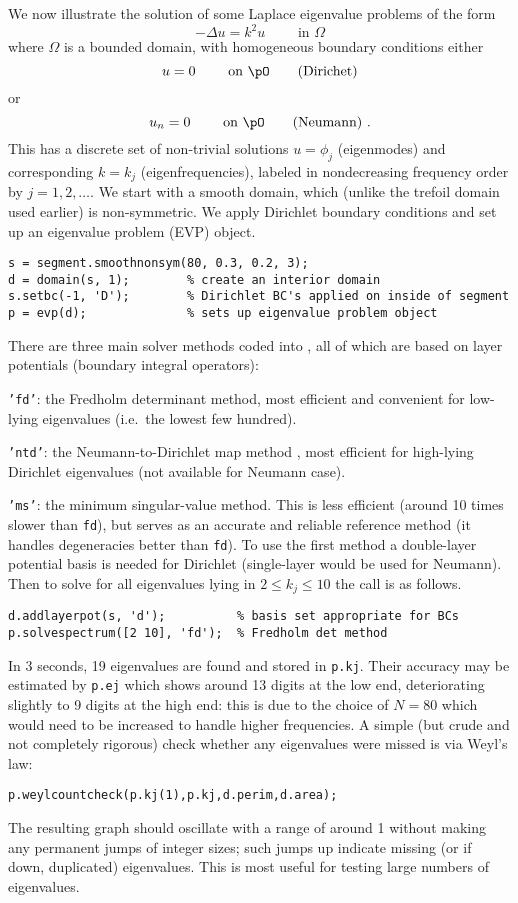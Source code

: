 We now illustrate the solution of some Laplace eigenvalue problems
of the form
$$
-\Delta u = k^2 u    \qquad \mbox{ in } \Omega
$$
where $\Omega$ is a bounded domain,
with homogeneous boundary conditions either
$$
u = 0 \qquad \mbox{ on } \pO   \qquad \mbox{(Dirichet)}
$$
or
$$
u_n = 0 \qquad \mbox{ on } \pO   \qquad \mbox{(Neumann)} ~.
$$
This has a discrete set of non-trivial solutions $u=\phi_j$ (eigenmodes) and corresponding $k=k_j$ (eigenfrequencies), labeled in nondecreasing
frequency order by $j=1,2,\ldots$.
We start with a smooth domain, which (unlike the trefoil domain
used earlier) is non-symmetric. We apply Dirichlet boundary conditions
and set up an eigenvalue problem (EVP) object.
\begin{verbatim}
s = segment.smoothnonsym(80, 0.3, 0.2, 3);
d = domain(s, 1);        % create an interior domain
s.setbc(-1, 'D');        % Dirichlet BC's applied on inside of segment
p = evp(d);              % sets up eigenvalue problem object
\end{verbatim}
There are three main solver methods coded into \mpspack,
all of which are based on layer potentials (boundary integral operators):
\bi
\item {\tt 'fd'}: the Fredholm determinant method, most efficient and convenient for low-lying
eigenvalues (i.e.\ the lowest few hundred).
\item  {\tt 'ntd'}: the Neumann-to-Dirichlet map method \cite{sca}, most efficient
for high-lying Dirichlet eigenvalues (not available for Neumann case).
\item {\tt 'ms'}: the minimum singular-value method. This is less efficient
(around 10 times slower than {\tt fd}),
but serves as an accurate and reliable reference method (it handles
degeneracies better than {\tt fd}).
\ei
To use the first method a double-layer potential basis is needed
for Dirichlet (single-layer would be used for Neumann).
Then to solve for all eigenvalues lying in $2\le k_j \le 10$ the call
is as follows.
\begin{verbatim}
d.addlayerpot(s, 'd');          % basis set appropriate for BCs
p.solvespectrum([2 10], 'fd');  % Fredholm det method
\end{verbatim}
In 3 seconds, 19 eigenvalues are found and stored in {\tt p.kj}.
Their accuracy may be estimated by {\tt p.ej} which shows
around 13 digits at the low end, deteriorating slightly to 9 digits
at the high end: this is due to the choice of $N=80$ which would need
to be increased to handle higher frequencies.
A simple (but crude and not completely rigorous) check whether any eigenvalues were missed is via Weyl's law:
\begin{verbatim}
p.weylcountcheck(p.kj(1),p.kj,d.perim,d.area);
\end{verbatim}
The resulting graph should oscillate with a range of around 1
without making any permanent
jumps of integer sizes; such jumps up indicate missing (or if down, duplicated)
eigenvalues.
This is most useful for testing large numbers of eigenvalues.

